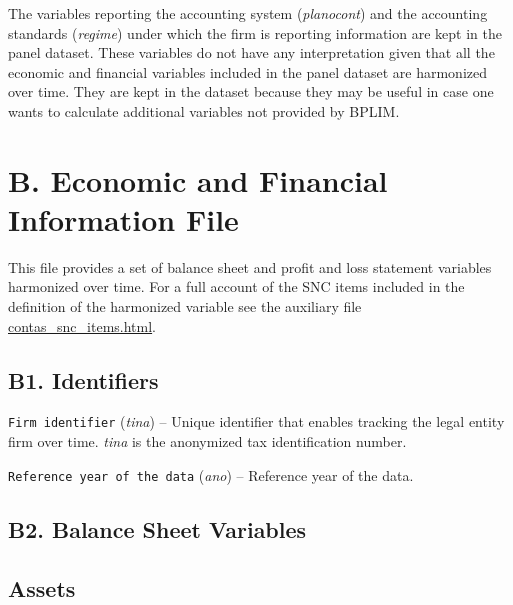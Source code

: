 \documentclass[]{book}
\begin{document}
The variables reporting the accounting system (\emph{planocont}) and the accounting standards (\emph{regime}) under which the firm is reporting information are kept in the panel dataset. These variables do not have any interpretation given that all the economic and financial variables included in the panel dataset are harmonized over time. They are kept in the dataset because they may be useful in case one wants to calculate additional variables not provided by BPLIM.

\hypertarget{b.-economic-and-financial-information-file}{%
\section{B. Economic and Financial Information File}\label{b.-economic-and-financial-information-file}}

This file provides a set of balance sheet and profit and loss statement variables harmonized over time. For a full account of the SNC items included in the definition of the harmonized variable see the auxiliary file \href{./Auxiliary\%20Files/variables_description/contas_snc_items.html}{contas\_snc\_items.html}.

\hypertarget{b1.-identifiers}{%
\subsection{B1. Identifiers}\label{b1.-identifiers}}

\texttt{Firm\ identifier} (\emph{tina}) -- Unique identifier that enables tracking the legal entity firm over time. \emph{tina} is the anonymized tax identification number.

\texttt{Reference\ year\ of\ the\ data} (\emph{ano}) -- Reference year of the data.

\hypertarget{b2.-balance-sheet-variables}{%
\subsection{B2. Balance Sheet Variables}\label{b2.-balance-sheet-variables}}

\hypertarget{assets}{%
\subsection{Assets}\label{assets}}
\end{document}
